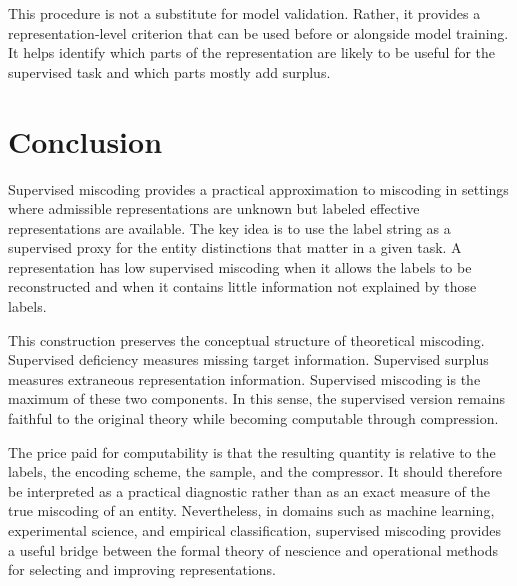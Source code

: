 This procedure is not a substitute for model validation. Rather, it provides a representation-level criterion that can be used before or alongside model training. It helps identify which parts of the representation are likely to be useful for the supervised task and which parts mostly add surplus.

\section{Conclusion}
\label{sec:supervised_miscoding_conclusion}

Supervised miscoding provides a practical approximation to miscoding in settings where admissible representations are unknown but labeled effective representations are available. The key idea is to use the label string as a supervised proxy for the entity distinctions that matter in a given task. A representation has low supervised miscoding when it allows the labels to be reconstructed and when it contains little information not explained by those labels.

This construction preserves the conceptual structure of theoretical miscoding. Supervised deficiency measures missing target information. Supervised surplus measures extraneous representation information. Supervised miscoding is the maximum of these two components. In this sense, the supervised version remains faithful to the original theory while becoming computable through compression.

The price paid for computability is that the resulting quantity is relative to the labels, the encoding scheme, the sample, and the compressor. It should therefore be interpreted as a practical diagnostic rather than as an exact measure of the true miscoding of an entity. Nevertheless, in domains such as machine learning, experimental science, and empirical classification, supervised miscoding provides a useful bridge between the formal theory of nescience and operational methods for selecting and improving representations.